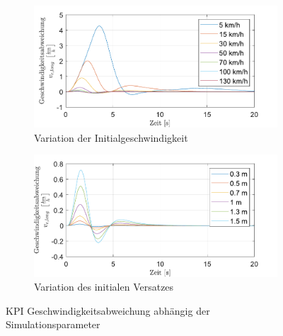 \begin{figure}
    \centering
    \begin{subfigure}[b]{.49\textwidth}
        \centering
        \includegraphics[width=\textwidth]{figures/3_Implementierung/Straight_Offset/varVelo_1mOffset_v-Diff.pdf}
        \caption{Variation der Initialgeschwindigkeit}
        \label{fig:varVelo_1mOffset_v-Diff}
    \end{subfigure}
    \hfill
    \begin{subfigure}[b]{.49\textwidth}
        \centering
        \includegraphics[width=\textwidth]{figures/3_Implementierung/Straight_Offset/varOffset_50kmh_v-Diff.pdf}
        \caption{Variation des initialen Versatzes}
        \label{fig:varOffset_50kmh_v-Diff}
    \end{subfigure}
    \caption{KPI Geschwindigkeitsabweichung abhängig der Simulationsparameter}
    \label{fig:Straight_Offset_v-Diff}
\end{figure}

